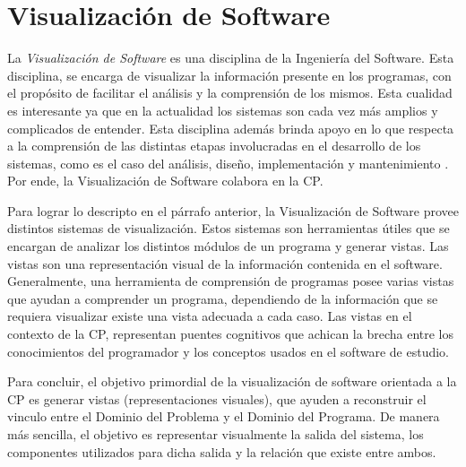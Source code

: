 
\enlargethispage{\baselineskip}%

\section{Visualización de Software}

La \textit{Visualización de Software} es una disciplina de la Ingeniería del Software. Esta disciplina, se encarga de visualizar la información presente en los programas, con el propósito de facilitar el análisis y la comprensión de los mismos. Esta cualidad es interesante ya que en la actualidad los sistemas son cada vez más amplios y complicados de entender. Esta disciplina además brinda apoyo en lo que respecta a la comprensión de las distintas etapas involucradas en el desarrollo de los sistemas, como es el caso del análisis, diseño, implementación y mantenimiento \cite{MBPHRU10}. Por ende, la Visualización de Software colabora en la CP.

Para lograr lo descripto en el párrafo anterior, la Visualización de Software provee distintos sistemas de visualización. Estos sistemas son herramientas útiles que se encargan de analizar los distintos módulos de un programa y generar vistas. Las vistas son una representación visual de la información contenida en el software. Generalmente, una herramienta de comprensión de programas posee varias vistas que ayudan a comprender un programa, dependiendo de la información que se requiera visualizar existe una vista adecuada a cada caso. Las vistas en el contexto de la CP, representan puentes cognitivos que achican la brecha entre los conocimientos del programador y los conceptos usados en el software de estudio.

Para concluir, el objetivo primordial de la visualización de software orientada a la CP es generar vistas (representaciones visuales), que ayuden a reconstruir el vinculo entre el Dominio del Problema y el Dominio del Programa. De manera más sencilla, el objetivo es representar visualmente la salida del sistema, los componentes utilizados para dicha salida y la relación que existe entre ambos.


